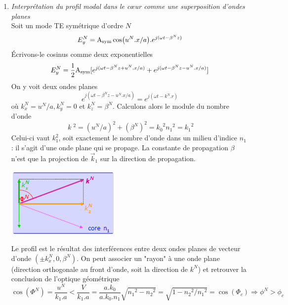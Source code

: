 \begin{enumerate}
\item \textit{Interprétation du profil modal dans le cœur comme une superposition d'ondes planes}\\
Soit un mode TE symétrique d'ordre $N$
\begin{equation}
E_y^N = {{\rm{A}}_{{\rm{sym}}}}\cos ({u^N}.x/a).{e^{j(\omega t - {\beta ^N}z)}}
\end{equation}
Écrivons-le cosinus comme deux exponentielles 
\begin{equation}
E_y^N = \frac{1}{2}{{\rm{A}}_{{\rm{sym}}}}[{e^{j(\omega t - {\beta ^N}z + {u^N}.x/a)}} + {e^{j(\omega t - {\beta ^N}z - {u^N}.x/a)}}]
\end{equation}
On y voit deux ondes planes
\begin{equation}
{e^{j(\omega t - {\beta ^N}z - {u^N}.x/a)}} = {e^{j(\omega t - {k^N}.r)}}
\end{equation}
où $k_x^N = u^N/a, k_y^N=0$ et $k_z^N=\beta^N$. Calculons alors le module du nombre d'onde
\begin{equation}
\;k\;{^2} = {({u^N}/a)^2} + {({\beta ^N})^2} = {k_0}^2{n_1}^2 = {k_1}^2
\end{equation}
Celui-ci vaut $k_1^2$, soit exactement le nombre d'onde dans un milieu d'indice $n_1$ : il s'agit
d'une onde plane qui se propage.  La constante de propagation $\beta$ n'est que la projection de 
$\vec k_1$ sur la direction de propagation. 

\begin{center}
	\includegraphics[scale=0.75]{ch1/image18.png}
\end{center}

Le profil est le résultat des interférences entre
deux ondes planes de vecteur d'onde $(\pm k_x^N,0,\beta^N)$. On peut associer un "rayon" à une
onde plane (direction orthogonale au front d'onde, soit la direction de $k^N$) et retrouver la 
conclusion de l'optique géométrique 
\begin{equation}
\cos ({\Phi ^N}) = \frac{{{u^N}}}{{{k_1}.a}} < \frac{V}{{{k_1}.a}} = \frac{{a.{k_0}}}{{a.{k_0}.{n_1}}}\sqrt {{n_1}^2 - {n_2}^2}  = \sqrt {1 - {n_2}^2/{n_1}^2}  = \cos ({\Phi _c})\Rightarrow
\phi^N > \phi_c
\end{equation}


\end{enumerate}
